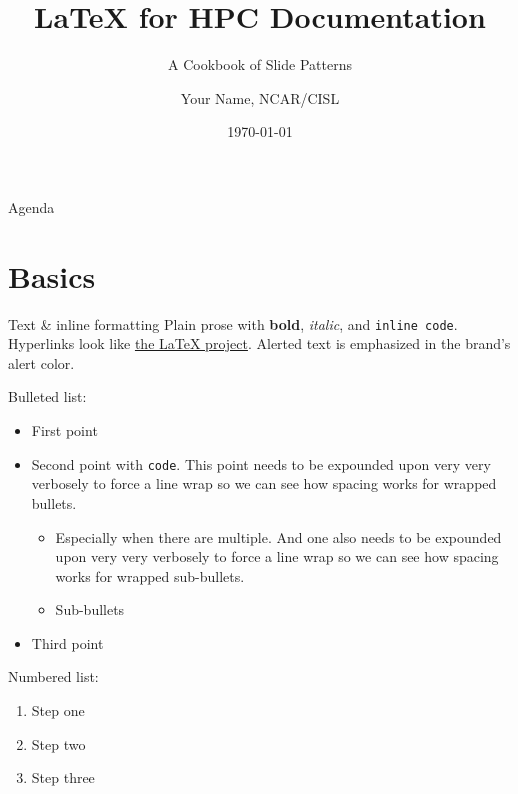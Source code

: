 \documentclass[aspectratio=\engineaspectratio]{beamer}
\title{LaTeX for HPC Documentation}
\subtitle{A Cookbook of Slide Patterns}
\author{Your Name, NCAR/CISL}
\institute{Computational \& Information Systems Laboratory}
\date{\today}
\begin{document}
\begin{frame}
  \titlepage
\end{frame}

\begin{frame}{Agenda}
  \engineagenda
\end{frame}

\section{Basics}

\begin{frame}{Text \& inline formatting}
  Plain prose with \textbf{bold}, \emph{italic}, and \texttt{inline code}. Hyperlinks look
  like \href{https://www.latex-project.org/}{the LaTeX project}. \alert{Alerted text} is
  emphasized in the brand's alert color.

  Bulleted list:
  \begin{itemize}
  \item First point
  \item Second point with \texttt{code}. This point needs to be expounded upon very very
    verbosely to force a line wrap so we can see how spacing works for wrapped bullets.
    \begin{itemize}
    \item Especially when there are multiple. And one also needs to be expounded upon very
      very verbosely to force a line wrap so we can see how spacing works for wrapped sub-bullets.
    \item Sub-bullets
    \end{itemize}
  \item Third point
  \end{itemize}

  Numbered list:
  \begin{enumerate}
  \item Step one
  \item Step two
  \item Step three
  \end{enumerate}
\end{frame}
\end{document}
